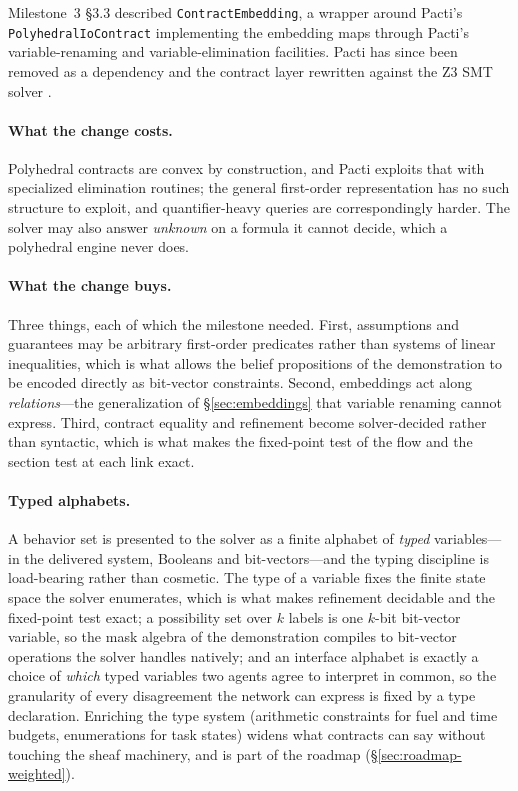 \documentclass[11pt]{article}
\newif\ifshowcomments
\theoremstyle{definition}
\theoremstyle{remark}
\newcommand{\prompt}[1]{%
    \ifshowcomments
        ~\todo[inline, color=techgold!80, textcolor=black,caption={Task}]{{\bf Prompt:} #1}%
    \fi
}
\begin{document}
\prompt{Develop initial Python code implementing the Laplacian, testing its application to
sample task assignments. Deliverable: Functional code, delivered with Milestone 3.}

Milestone~3 \S3.3 described \texttt{ContractEmbedding}, a wrapper around Pacti's
\texttt{PolyhedralIoContract} implementing the embedding maps through Pacti's variable-renaming
and variable-elimination facilities.
Pacti has since been removed as a dependency and the contract layer rewritten against the Z3
SMT solver \citep{deMouraZ32008}.

\paragraph{What the change costs.}
Polyhedral contracts are convex by construction, and Pacti exploits that with specialized
elimination routines; the general first-order representation has no such structure to exploit,
and quantifier-heavy queries are correspondingly harder.
The solver may also answer \emph{unknown} on a formula it cannot decide, which a polyhedral
engine never does.

\paragraph{What the change buys.}
Three things, each of which the milestone needed.
First, assumptions and guarantees may be arbitrary first-order predicates rather than systems
of linear inequalities, which is what allows the belief propositions of the demonstration to be
encoded directly as bit-vector constraints.
Second, embeddings act along \emph{relations}---the generalization of \S\ref{sec:embeddings}
that variable renaming cannot express.
Third, contract equality and refinement become solver-decided rather than syntactic, which is
what makes the fixed-point test of the flow and the section test at each link exact.

\paragraph{Typed alphabets.}
A behavior set is presented to the solver as a finite alphabet of \emph{typed} variables---in
the delivered system, Booleans and bit-vectors---and the typing discipline is load-bearing
rather than cosmetic.
The type of a variable fixes the finite state space the solver enumerates, which is what makes
refinement decidable and the fixed-point test exact; a possibility set over $k$ labels is one
$k$-bit bit-vector variable, so the mask algebra of the demonstration compiles to bit-vector
operations the solver handles natively; and an interface alphabet is exactly a choice of
\emph{which} typed variables two agents agree to interpret in common, so the granularity of
every disagreement the network can express is fixed by a type declaration.
Enriching the type system (arithmetic constraints for fuel and time budgets, enumerations for
task states) widens what contracts can say without touching the sheaf machinery, and is part
of the roadmap (\S\ref{sec:roadmap-weighted}).
\end{document}
